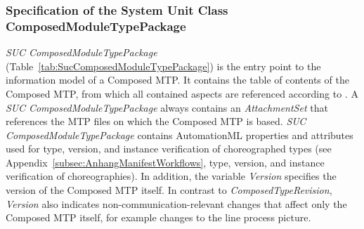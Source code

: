\subsubsection{Specification of the System Unit Class ComposedModuleTypePackage}

\emph{SUC ComposedModuleTypePackage} (Table~\ref{tab:SucComposedModuleTypePackage}) is the entry point to the information model of a Composed MTP. It contains the table of contents of the Composed MTP, from which all contained aspects are referenced according to \cite{PNO.2025.Part1}. A \emph{SUC ComposedModuleTypePackage} always contains an \emph{AttachmentSet} that references the MTP files on which the Composed MTP is based. \emph{SUC ComposedModuleTypePackage} contains AutomationML properties and attributes used for type, version, and instance verification of choreographed types (see Appendix~\ref{subsec:AnhangManifestWorkflows}, type, version, and instance verification of choreographies). In addition, the variable \emph{Version} specifies the version of the Composed MTP itself. In contrast to \emph{ComposedTypeRevision}, \emph{Version} also indicates non-communication-relevant changes that affect only the Composed MTP itself, for example changes to the line process picture.

